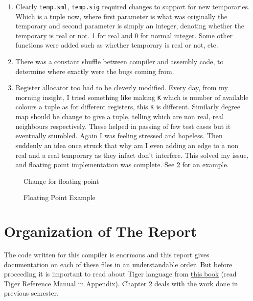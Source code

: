 \begin{enumerate}
  \item Clearly \texttt{temp.sml}, \texttt{temp.sig} required changes to support for new temporaries. Which is a tuple now, where first parameter is what was originally the temporary and second parameter is simply an integer, denoting whether the temporary is real or not. 1 for real and 0 for normal integer. Some other functions were added such as whether temporary is real or not, etc.
  \item There was a constant shuffle between compiler and assembly code, to determine where exactly were the bugs coming from.
  \item Register allocator too had to be cleverly modified. Every day, from my morning insight, I tried something like making \texttt{K} which is number of available colours a tuple as for different registers, this \texttt{K} is different. Similarly degree map should be change to give a tuple, telling which are non real, real neighbours respectively. These helped in passing of few test cases but it eventually stumbled. Again I was feeling stressed and hopeless. Then suddenly an idea once struck that why am I even adding an edge to a non real and a real temporary as they infact don't interfere. This solved my issue, and floating point implementation was complete. See \ref{fig:ft2} for an example.
\end{enumerate}

\begin{figure}
\centering
{}
\caption{Change for floating point}
\label{fig:ft1}
\end{figure}


\begin{figure}
\centering
{}
\caption{Floating Point Example}
\label{fig:ft2}
\end{figure}


\section{Organization of The Report}

The code written for this compiler is enormous and this report gives documentation on each of these files in an understandable order. But before proceeding it is important to read about Tiger language from \href{https://www.cs.princeton.edu/~appel/modern/ml/}{this book} (read Tiger Reference Manual in Appendix). Chapter 2 deals with the work done in previous semester. 

